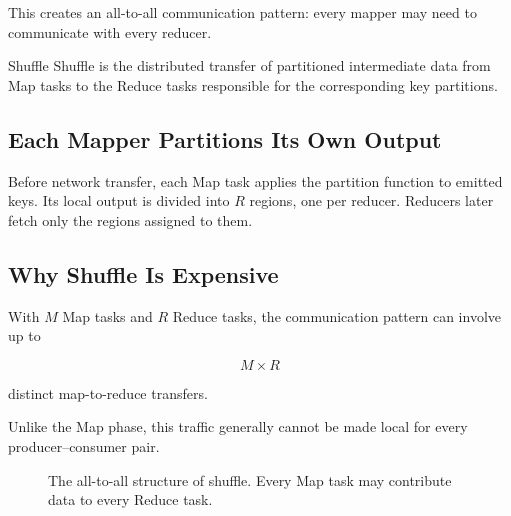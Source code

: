 \documentclass[11pt,a4paper,oneside]{book}
\begin{document}
This creates an all-to-all communication pattern: every mapper may need to communicate with every reducer.

\begin{definitionbox}{Shuffle}
Shuffle is the distributed transfer of partitioned intermediate data from Map tasks to the Reduce tasks responsible for the corresponding key partitions.
\end{definitionbox}

\subsection{Each Mapper Partitions Its Own Output}

Before network transfer, each Map task applies the partition function to emitted keys. Its local output is divided into \(R\) regions, one per reducer. Reducers later fetch only the regions assigned to them.

\subsection{Why Shuffle Is Expensive}

With \(M\) Map tasks and \(R\) Reduce tasks, the communication pattern can involve up to

\begin{equation}
M\times R
\label{eq:shuffle-links}
\end{equation}

distinct map-to-reduce transfers.

Unlike the Map phase, this traffic generally cannot be made local for every producer--consumer pair.

\begin{figure}[htbp]
\centering
{}
\caption{The all-to-all structure of shuffle. Every Map task may contribute data to every Reduce task.}
\label{fig:shuffle-alltoall}
\end{figure}
\end{document}
